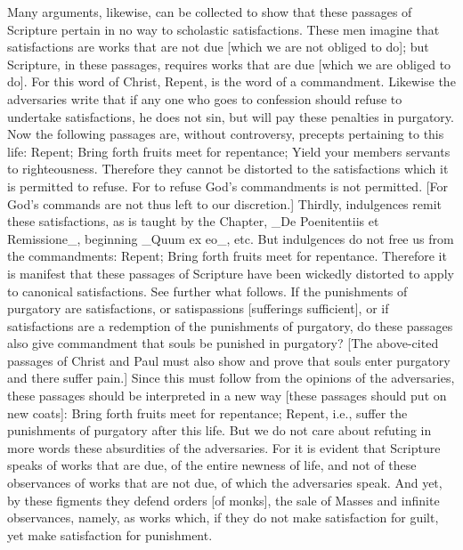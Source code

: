Many arguments, likewise, can be collected to show that these
passages of Scripture pertain in no way to scholastic satisfactions.
These men imagine that satisfactions are works that are not due
[which we are not obliged to do]; but Scripture, in these passages,
requires works that are due [which we are obliged to do].  For this
word of Christ, Repent, is the word of a commandment.  Likewise the
adversaries write that if any one who goes to confession should
refuse to undertake satisfactions, he does not sin, but will pay
these penalties in purgatory.  Now the following passages are,
without controversy, precepts pertaining to this life: Repent; Bring
forth fruits meet for repentance; Yield your members servants to
righteousness.  Therefore they cannot be distorted to the
satisfactions which it is permitted to refuse.  For to refuse God's
commandments is not permitted.  [For God's commands are not thus left
to our discretion.] Thirdly, indulgences remit these satisfactions,
as is taught by the Chapter, _De Poenitentiis et Remissione_,
beginning _Quum ex eo_, etc. But indulgences do not free us from the
commandments: Repent; Bring forth fruits meet for repentance.
Therefore it is manifest that these passages of Scripture have been
wickedly distorted to apply to canonical satisfactions.  See further
what follows.  If the punishments of purgatory are satisfactions, or
satispassions [sufferings sufficient], or if satisfactions are a
redemption of the punishments of purgatory, do these passages also
give commandment that souls be punished in purgatory?  [The
above-cited passages of Christ and Paul must also show and prove that
souls enter purgatory and there suffer pain.] Since this must follow
from the opinions of the adversaries, these passages should be
interpreted in a new way [these passages should put on new coats]:
Bring forth fruits meet for repentance; Repent, i.e., suffer the
punishments of purgatory after this life.  But we do not care about
refuting in more words these absurdities of the adversaries.  For it
is evident that Scripture speaks of works that are due, of the entire
newness of life, and not of these observances of works that are not
due, of which the adversaries speak.  And yet, by these figments they
defend orders [of monks], the sale of Masses and infinite observances,
namely, as works which, if they do not make satisfaction for guilt,
yet make satisfaction for punishment.


